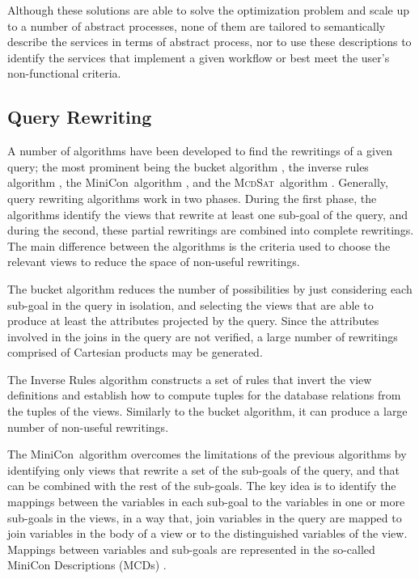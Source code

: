 \documentclass{llncs}
\newcommand{\mcdsat}{\textsc{McdSat}}
\newcommand{\minicon}{{MiniCon}}
\begin{document}
Although these solutions are able to solve the optimization problem and scale up
to a number of abstract processes, none of them are tailored to semantically describe
the services in terms of abstract process, nor to use these descriptions to 
identify the services that implement a given workflow or best meet the user's
non-functional criteria.

\subsection{Query Rewriting}

A number of algorithms have been developed to find the rewritings of a given query;
the most prominent being the bucket algorithm \cite{levy:bucket}, the inverse rules
algorithm \cite{pods:DuschkaG97,Qian96}, the \minicon\ algorithm \cite{pottinger:minicon},
and the \mcdsat\ algorithm \cite{arvelo:aaai06}.
Generally, query rewriting algorithms work in two phases. During the first phase,
the algorithms identify the views that rewrite at least one sub-goal of the query, and
during the second, these partial rewritings are combined into complete rewritings.
The main difference between the algorithms is the criteria used to choose the relevant
views to reduce the space of non-useful rewritings.

The bucket algorithm reduces the number of possibilities by just considering each
sub-goal in the query in isolation, and selecting the views that are able to produce
at least the attributes projected by the query. Since the attributes involved in the
joins in the query are not verified, a large number of rewritings comprised of Cartesian
products may be generated. 	

The Inverse Rules algorithm constructs a set of rules that invert the view definitions
and establish how to compute tuples for the database relations from the tuples of the
views. Similarly to the bucket algorithm, it can produce a large number of non-useful
rewritings. 

The \minicon\ algorithm overcomes the limitations of the previous algorithms by identifying
only views that rewrite a set of the sub-goals of the query, and that can be combined with
the rest of the sub-goals. The key idea is to identify the mappings between the variables in
each sub-goal to the variables in one or more sub-goals in the views, in a way
that, join variables in the query are mapped to join variables in the body of a view or to
the distinguished variables of the view. Mappings between variables and sub-goals are
represented in the so-called MiniCon Descriptions (MCDs) \cite{pottinger:minicon}.
\end{document}
